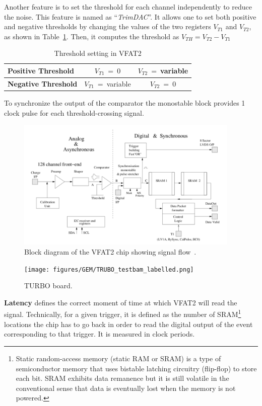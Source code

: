 Another feature is to set the threshold for each channel independently to reduce the noise. This feature is named as ``\textit{TrimDAC}''.  It allows one to set both positive and negative thresholds by changing the values of the two registers $V_{T1}$ and $V_{T2}$, as shown in Table~\ref{tab:threshold_vfat2}. Then, it computes the threshold as $V_{TH} = V_{T2} - V_{T1}$
\begin{table}
\centering 
\begin{tabular}[h]{|l | c | c |}
\hline
\textbf{Positive Threshold}     &  $V_{T1}~=~0$         &   $V_{T2}~=~$variable \\
\hline
\textbf{Negative Threshold}     &  $V_{T1}~=~$variable  &   $V_{T2}~=~0$        \\
\hline
\end{tabular}
\caption{Threshold setting in VFAT2}
\label{tab:threshold_vfat2}
\end{table}

To synchronize the output of the comparator the monostable block provides 1 clock pulse for each threshold-crossing signal.

\begin{figure}[htbp]
    \centering
    \includegraphics[width=0.95\textwidth]{figures/GEM/VFAT2_chip_BlockDiagram.png}
    \caption{Block diagram of the VFAT2 chip showing signal flow~\cite{Aspell2007}.}
    \label{fig:label}
\end{figure}

\begin{figure}[htbp]
    \centering
    \texttt{[image: figures/GEM/TRUBO\_testbam\_labelled.png]}
    \caption{TURBO board.}
    \label{fig:turbo}
\end{figure}
\textbf{Latency} defines the correct moment of time at which VFAT2 will read the signal. Technically, for a given trigger, it is defined as the number of SRAM\footnote{Static random-access memory (static RAM or SRAM) is a type of semiconductor memory that uses bistable latching circuitry (flip-flop) to store each bit. SRAM exhibits data remanence but it is still volatile in the conventional sense that data is eventually lost when the memory is not powered.} locations the chip has to go back in order to read the digital output of the event corresponding to that trigger. It is measured in clock periods. 

